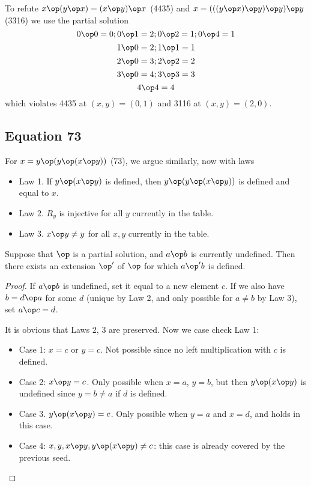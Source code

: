 To refute $x \op (y \op x) = (x \op y) \op x$ (4435) and $x = (((y \op x) \op y) \op y) \op y$ (3316) we use the partial solution
$$ 0 \op 0 = 0; 0 \op 1 = 2; 0 \op 2 = 1; 0 \op 4 = 1$$
$$ 1 \op 0 = 2; 1 \op 1 = 1$$
$$ 2 \op 0 = 3; 2 \op 2 = 2$$
$$ 3 \op 0 = 4; 3 \op 3 = 3$$
$$ 4 \op 4 = 4$$
which violates 4435 at $(x,y)=(0,1)$ and 3116 at $(x,y)=(2,0).$

\subsection{Equation 73}

For $x = y \op (y \op (x \op y))$ (73), we argue similarly, now with laws
\begin{itemize}
\item Law 1.  If $y \op (x \op y)$ is defined, then $y \op (y \op (x \op y))$ is defined and equal to $x$.
\item Law 2.  $R_y$ is injective for all $y$ currently in the table.
\item Law 3.  $x \op y \neq y$ for all $x,y$ currently in the table.
\end{itemize}

\begin{lemma}[73 extension]\label{73-extension}  Suppose that $\op$ is a partial solution, and $a \op b$ is currently undefined.  Then there exists an extension $\op'$ of $\op$ for which $a \op' b$ is defined.
\end{lemma}

\begin{proof} If $a \op b$ is undefined, set it equal to a new element $c$.  If we also have $b = d \op a$ for some $d$ (unique by Law 2, and only possible for $a \neq b$ by Law 3), set $a \op c = d$.

It is obvious that Laws 2, 3 are preserved.   Now we case check Law 1:
\begin{itemize}
\item Case 1: $x=c$ or $y=c$.  Not possible since no left multiplication with $c$ is defined.
\item Case 2: $x \op y = c$.  Only possible when $x = a$, $y = b$, but then $y \op (x \op y)$ is undefined since $y = b \neq a$ if $d$ is defined.
\item Case 3. $y \op (x \op y) = c$.  Only possible when $y=a$ and $x=d$, and holds in this case.
\item Case 4: $x, y, x \op y, y \op (x \op y) \neq c$: this case is already covered by the previous seed.
\end{itemize}
\end{proof}

